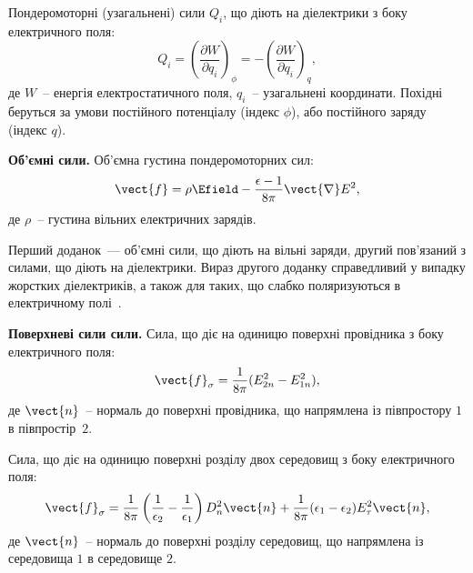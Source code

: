 \begin{Theory}
Пондеромоторні (узагальнені) сили $Q_i$, що діють на діелектрики з боку електричного поля:
\begin{equation}
	Q_i = \left(\frac{\partial W}{\partial q_i} \right)_{\phi} =  -\left(\frac{\partial W}{\partial q_i} \right)_q,
\end{equation}
де $W$~-- енергія електростатичного поля, $q_i$~-- узагальнені координати. Похідні беруться за умови постійного потенціалу (індекс $\phi$), або постійного заряду (індекс $q$).

\textbf{Об'ємні сили.} Об'ємна густина пондеромоторних сил:
\begin{equation}
	\vect{f} = \rho\Efield - \frac{\epsilon - 1}{8\pi}\vect{\nabla} E^2,
\end{equation}
де $\rho$~-- густина вільних електричних зарядів.
\begin{Attention}
Перший доданок~--- об'ємні сили, що діють на вільні заряди, другий пов'язаний з силами, що діють на діелектрики. Вираз другого доданку справедливий у випадку жорстких діелектриків, а також для таких, що слабко поляризуються  в електричному полі~\cite[\S 32]{Tamm}.
\end{Attention}

\textbf{Поверхневі сили сили.} Сила, що діє на одиницю поверхні провідника з боку електричного поля:
\begin{equation}
	\vect{f}_{\sigma} = \frac{1}{8\pi} ( E^2_{2n} - E^2_{1n}),
\end{equation}
де $\vect{n}$~-- нормаль до поверхні провідника, що напрямлена із півпростору $1$  в півпростір~$2$.
\begin{center}
\end{center}

Сила, що діє на одиницю поверхні розділу двох середовищ з боку електричного поля:
\begin{equation}
	\vect{f}_{\sigma} = \frac{1}{8\pi} \left(\frac{1}{\epsilon_2} - \frac{1}{\epsilon_1}\right) D^2_n\vect{n} + \frac{1}{8\pi} (\epsilon_1 - \epsilon_2) E^2_{\tau} \vect{n},
\end{equation}
де $\vect{n}$~-- нормаль до поверхні розділу середовищ, що напрямлена із середовища $1$  в середовище $2$.
\begin{center}
\end{center}

\end{Theory}

